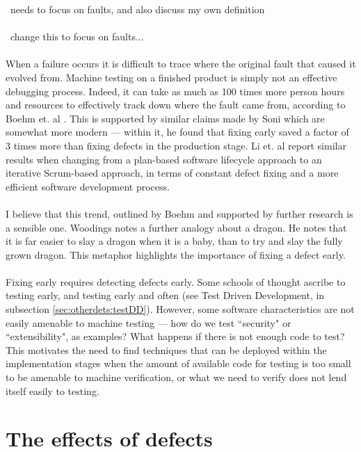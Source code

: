 \FIXME\ needs to focus on faults, and also discuss my own definition\\
\\
\FIXME\ change this to focus on faults...\\
\\
When a failure occurs it is difficult to trace where the original fault that caused it evolved from.
Machine testing on a finished product is simply not an effective debugging process.
Indeed, it can take as much as 100 times more person hours and resources to effectively track down
where the fault came from, according to Boehm et. al \cite{boehm2005foundations}.
This is supported by similar claims made by Soni \cite{soni2006defect} which are somewhat more
modern --- within it, he found that fixing early saved a factor of 3 times more than fixing defects
in the production stage.
Li et. al \cite{li2010transition} report similar results when changing from a plan-based software
lifecycle approach to an iterative Scrum-based approach, in terms of constant defect fixing and a
more efficient software development process.\\
\\
I believe that this trend, outlined by Boehm and supported by further research is a sensible one.
Woodings \cite{terryLecture4220} notes a further analogy about a dragon.
He notes that it is far easier to slay a dragon when it is a baby, than to try and slay the fully
grown dragon.
This metaphor highlights the importance of fixing a defect early.\\
\\
Fixing early requires detecting defects early.
Some schools of thought ascribe to testing early, and testing early and often (see Test Driven Development, in
subsection \ref{sec:otherdets:testDD}).
However, some software characteristics are not easily amenable to machine testing --- how do we test
``security" or ``extensibility", as examples?
What happens if there is not enough code to test?
This motivates the need to find techniques that can be deployed within the implementation stages
when the amount of available code for testing is too small to be amenable to machine verification,
or what we need to verify does not lend itself easily to testing.

\section{The effects of defects} \label{sec:defects:defEffects}

